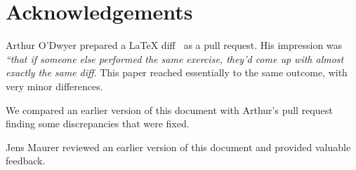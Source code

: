 \section{Acknowledgements}

Arthur O'Dwyer prepared a LaTeX diff~\cite{diff:remove:ctx} as a pull request.
His impression was \emph{``that if someone else performed the same exercise,
they'd come up with almost exactly the same diff}. This paper reached
essentially to the same outcome, with very minor differences.

We compared an earlier version of this document with Arthur's pull
request finding some discrepancies that were fixed.

Jens Maurer reviewed an earlier version of this document and provided valuable feedback.

